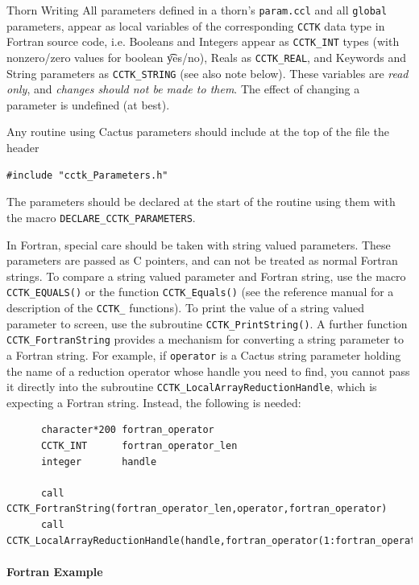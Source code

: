 \begin{cactuspart}{Thorn Writing}
All parameters defined in a thorn's \texttt{param.ccl} and all \texttt{global}
parameters, appear as local variables of the corresponding \texttt{CCTK} data type
in Fortran source code, i.e. Booleans and Integers appear as \texttt{CCTK\_INT}
types (with nonzero/zero values for boolean {\t yes/no}),
Reals as \texttt{CCTK\_REAL}, and Keywords and String parameters as
\texttt{CCTK\_STRING} (see
also note below). These variables are \emph{read only}, and \emph{changes should
not be made to them}. The effect of changing a parameter is undefined (at best).

Any routine using Cactus parameters should include at
the top of the file the header
\begin{verbatim}
#include "cctk_Parameters.h"
\end{verbatim}

The parameters should be declared at the start of the routine
using them with the macro \texttt{DECLARE\_CCTK\_PARAMETERS}.

In Fortran, special care should be taken with string valued parameters.
These parameters are passed as C pointers, and can not be treated as
normal Fortran strings.
To compare a string valued parameter and Fortran
string, use the macro \texttt{CCTK\_EQUALS()} or the function \texttt{CCTK\_Equals()}
(see the reference manual for a description of the \texttt{CCTK\_} functions).
To print the value of a string valued parameter to screen, use the subroutine
\texttt{CCTK\_PrintString()}. A further function \texttt{CCTK\_FortranString}
provides a mechanism for converting a string parameter to a Fortran string.
For example, if \texttt{operator} is a Cactus string parameter holding the name of a reduction operator whose handle you need to find, you cannot pass it
directly into the subroutine \texttt{CCTK\_LocalArrayReductionHandle}, which is expecting
a Fortran string. Instead, the following is needed:
%
\begin{verbatim}
      character*200 fortran_operator
      CCTK_INT      fortran_operator_len
      integer       handle

      call CCTK_FortranString(fortran_operator_len,operator,fortran_operator)
      call CCTK_LocalArrayReductionHandle(handle,fortran_operator(1:fortran_operator_len))
\end{verbatim}



\paragraph{Fortran Example}


\end{cactuspart}
